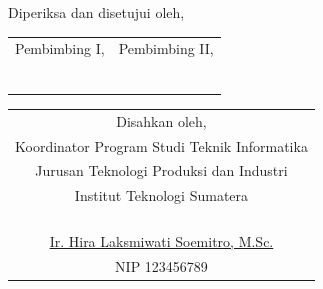 \begin{center}
	\centering Diperiksa dan disetujui oleh,
	\vspace{2em} %
	\justify
    \setlength{\tabcolsep}{0pt}
    \begin{tabular}{p{}p{}}
        \multicolumn{1}{c}{Pembimbing I,} & \multicolumn{1}{c}{Pembimbing II,} \\
        & \\
        & \\
        & \\
        & \\
		\multicolumn{1}{c}{\underline{\printnamadosbinga}} & \multicolumn{1}{c}{\underline{\printnamadosbingb}} \\
		\multicolumn{1}{c}{\printnipdosbinga} & \multicolumn{1}{c}{\printnipdosbingb} \\
    \end{tabular}
	\vfill

	\centering 
	\begin{tabular}{c}
		Disahkan oleh,\\
		Koordinator Program Studi Teknik Informatika\\
		Jurusan Teknologi Produksi dan Industri\\
		Institut Teknologi Sumatera
		\\
		\\
		\\
		\\
		\\
		\underline{Ir. Hira Laksmiwati Soemitro, M.Sc.} \\ %
		NIP 123456789 \\
	\end{tabular}
	
\end{center}
\clearpage
